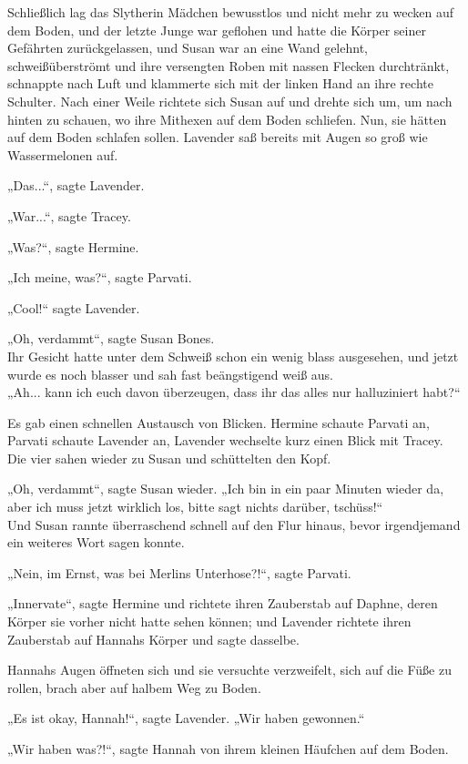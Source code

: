 {Schließlich lag das Slytherin Mädchen bewusstlos und nicht mehr zu wecken auf dem Boden, und der letzte Junge war geflohen und hatte die Körper seiner Gefährten zurückgelassen, und Susan war an eine Wand gelehnt, schweißüberströmt und ihre versengten Roben mit nassen Flecken durchtränkt, schnappte nach Luft und klammerte sich mit der linken Hand an ihre rechte Schulter. Nach einer Weile richtete sich Susan auf und drehte sich um, um nach hinten zu schauen, wo ihre Mithexen auf dem Boden schliefen. Nun, sie hätten auf dem Boden schlafen sollen. Lavender saß bereits mit Augen so groß wie Wassermelonen auf.

„Das...“, sagte Lavender.

„War...“, sagte Tracey.

„Was?“, sagte Hermine.

„Ich meine, was?“, sagte Parvati.

„Cool!“ sagte Lavender.

„Oh, verdammt“, sagte Susan Bones.\\ Ihr Gesicht hatte unter dem Schweiß schon ein wenig blass ausgesehen, und jetzt wurde es noch blasser und sah fast beängstigend weiß aus.\\ „Ah... kann ich euch davon überzeugen, dass ihr das alles nur halluziniert habt?“

Es gab einen schnellen Austausch von Blicken. Hermine schaute Parvati an, Parvati schaute Lavender an, Lavender wechselte kurz einen Blick mit Tracey. Die vier sahen wieder zu Susan und schüttelten den Kopf.

„Oh, verdammt“, sagte Susan wieder. „Ich bin in ein paar Minuten wieder da, aber ich muss jetzt wirklich los, bitte sagt nichts darüber, tschüss!“\\ Und Susan rannte überraschend schnell auf den Flur hinaus, bevor irgendjemand ein weiteres Wort sagen konnte.

„Nein, im Ernst, was bei Merlins Unterhose?!“, sagte Parvati.

„Innervate“, sagte Hermine und richtete ihren Zauberstab auf Daphne, deren Körper sie vorher nicht hatte sehen können; und Lavender richtete ihren Zauberstab auf Hannahs Körper und sagte dasselbe.

Hannahs Augen öffneten sich und sie versuchte verzweifelt, sich auf die Füße zu rollen, brach aber auf halbem Weg zu Boden.

„Es ist okay, Hannah!“, sagte Lavender. „Wir haben gewonnen.“

„Wir haben was?!“, sagte Hannah von ihrem kleinen Häufchen auf dem Boden.

}
